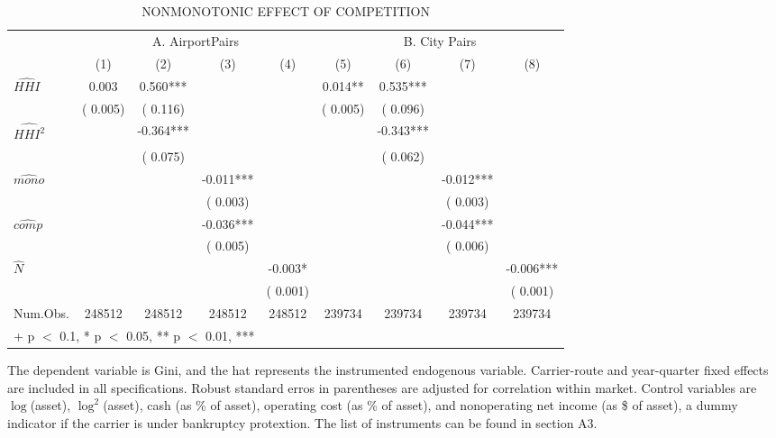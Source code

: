 \begin{table}
\centering
\caption{NONMONOTONIC EFFECT OF COMPETITION}
\centering
	\begin{threeparttable}
		\begin{tabular}[t]{lcccccccc}\toprule\multicolumn{1}{c}{ } & \multicolumn{4}{c}{A. AirportPairs} & \multicolumn{4}{c}{B. City Pairs} \\\cmidrule(l{3pt}r{3pt}){2-5} \cmidrule(l{3pt}r{3pt}){6-9}  & (1) & (2) & (3) & (4) & (5) & (6) & (7) & (8)\\\midrule
			$\widehat{HHI}$ &  {0.003} &  {0.560}*** &  &  &  {0.014}** &  {0.535}*** &  & \\ & ( {0.005}) & ( {0.116}) &  &  & ( {0.005}) & ( {0.096}) &  & \\
			$\widehat{HHI^{2}}$ &  &  {-0.364}*** &  &  &  &  {-0.343}*** &  & \\ &  & ( {0.075}) &  &  &  & ( {0.062}) &  & \\
			$\widehat{mono}$ &  &  &  {-0.011}*** &  &  &  &  {-0.012}*** & \\ &  &  & ( {0.003}) &  &  &  & ( {0.003}) & \\
			$\widehat{comp}$ &  &  &  {-0.036}*** &  &  &  &  {-0.044}*** & \\ &  &  & ( {0.005}) &  &  &  & ( {0.006}) & \\
			$\widehat{N}$ &  &  &  &  {-0.003}* &  &  &  &  {-0.006}***\\ &  &  &  & ( {0.001}) &  &  &  & ( {0.001})\\\midrule
			Num.Obs. &  {248512} &  {248512} &  {248512} &  {248512} &  {239734} &  {239734} &  {239734} &  {239734}\\\bottomrule\multicolumn{9}{l}{\rule{0pt}{1em}+ p $<$ 0.1, * p $<$ 0.05, ** p $<$ 0.01, ***}\\
			\end{tabular}
			\begin{tablenotes}
				\item The dependent variable is Gini, and the hat represents the instrumented endogenous variable. Carrier-route and year-quarter fixed effects are included in all specifications. Robust standard erros in parentheses are adjusted for correlation within market. Control variables are $\log$(asset), $\log^{2}$(asset), cash (as \% of asset), operating cost (as \% of asset), and nonoperating net income (as \$ of asset), a dummy indicator if the carrier is under bankruptcy protextion. The list of instruments can be found in section A3.
			\end{tablenotes}
	\end{threeparttable}
	\end{table}